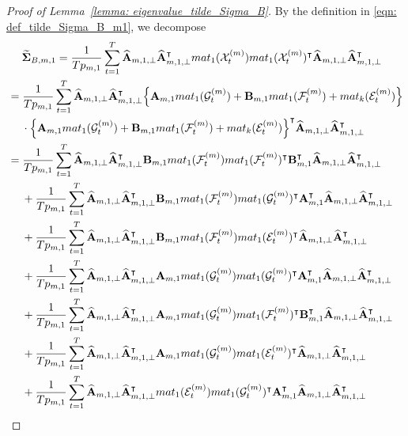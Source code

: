 \documentclass[10pt,a4paper]{amsart}
\def\bA{\mathbf{A}}
\def\bB{\mathbf{B}}
\def\bSigma{\boldsymbol{\Sigma}} \def\bOmega{\boldsymbol{\Omega}}
\def\cE{\mathcal{E}}
\def\cF{\mathcal{F}}
\def\cG{\mathcal{G}} \def\cH{\boldsymbol{\mathcal{H}}} \def\cI{\mathcal{I}}
\def\cX{\mathcal{X}}
\def\mat{\textnormal{\textsc{mat}}}
\def\trans{\intercal}
\def\wh#1{\widehat{#1}}
\def\wt#1{\widetilde{#1}}
\begin{document}
\begin{proof}[Proof of Lemma~\ref{lemma: eigenvalue_tilde_Sigma_B}]
By the definition in \eqref{eqn: def_tilde_Sigma_B_m1}, we decompose
\begin{align}
    &\;\quad
    \wt\bSigma_{B,m,1} = \frac{1}{Tp_{m,1}} \sum_{t=1}^T \wh{\bA}_{m,1,\perp} \wh{\bA}_{m,1,\perp}^\trans \mat_1(\cX_t^{(m)}) \mat_1(\cX_t^{(m)})^\trans \wh{\bA}_{m,1,\perp} \wh{\bA}_{m,1,\perp}^\trans \notag \\
    &=
    \frac{1}{Tp_{m,1}} \sum_{t=1}^T \wh{\bA}_{m,1,\perp} \wh{\bA}_{m,1,\perp}^\trans \Big\{ \bA_{m,1} \mat_1(\cG_t^{(m)}) + \bB_{m,1} \mat_1(\cF_t^{(m)}) + \mat_k(\cE_t^{(m)}) \Big\} \notag \\
    &\;\quad
    \cdot \Big\{ \bA_{m,1} \mat_1(\cG_t^{(m)}) + \bB_{m,1} \mat_1(\cF_t^{(m)}) + \mat_k(\cE_t^{(m)}) \Big\}^\trans \wh{\bA}_{m,1,\perp} \wh{\bA}_{m,1,\perp}^\trans \notag \\
    &=
    \frac{1}{Tp_{m,1}} \sum_{t=1}^T \wh{\bA}_{m,1,\perp} \wh{\bA}_{m,1,\perp}^\trans \bB_{m,1} \mat_1(\cF_t^{(m)}) \mat_1(\cF_t^{(m)})^\trans \bB_{m,1}^\trans \wh{\bA}_{m,1,\perp} \wh{\bA}_{m,1,\perp}^\trans \notag \\
    &\;\quad
    + \frac{1}{Tp_{m,1}} \sum_{t=1}^T \wh{\bA}_{m,1,\perp} \wh{\bA}_{m,1,\perp}^\trans \bB_{m,1} \mat_1(\cF_t^{(m)}) \mat_1(\cG_t^{(m)})^\trans \bA_{m,1}^\trans \wh{\bA}_{m,1,\perp} \wh{\bA}_{m,1,\perp}^\trans \notag \\
    &\;\quad
    + \frac{1}{Tp_{m,1}} \sum_{t=1}^T \wh{\bA}_{m,1,\perp} \wh{\bA}_{m,1,\perp}^\trans \bB_{m,1} \mat_1(\cF_t^{(m)}) \mat_1(\cE_t^{(m)})^\trans \wh{\bA}_{m,1,\perp} \wh{\bA}_{m,1,\perp}^\trans \notag \\
    &\;\quad
    + \frac{1}{Tp_{m,1}} \sum_{t=1}^T \wh{\bA}_{m,1,\perp} \wh{\bA}_{m,1,\perp}^\trans \bA_{m,1} \mat_1(\cG_t^{(m)}) \mat_1(\cG_t^{(m)})^\trans \bA_{m,1}^\trans \wh{\bA}_{m,1,\perp} \wh{\bA}_{m,1,\perp}^\trans \notag \\
    &\;\quad
    + \frac{1}{Tp_{m,1}} \sum_{t=1}^T \wh{\bA}_{m,1,\perp} \wh{\bA}_{m,1,\perp}^\trans \bA_{m,1} \mat_1(\cG_t^{(m)}) \mat_1(\cF_t^{(m)})^\trans \bB_{m,1}^\trans \wh{\bA}_{m,1,\perp} \wh{\bA}_{m,1,\perp}^\trans \notag \\
    &\;\quad
    + \frac{1}{Tp_{m,1}} \sum_{t=1}^T \wh{\bA}_{m,1,\perp} \wh{\bA}_{m,1,\perp}^\trans \bA_{m,1} \mat_1(\cG_t^{(m)}) \mat_1(\cE_t^{(m)})^\trans \wh{\bA}_{m,1,\perp} \wh{\bA}_{m,1,\perp}^\trans \notag \\
    &\;\quad
    + \frac{1}{Tp_{m,1}} \sum_{t=1}^T \wh{\bA}_{m,1,\perp} \wh{\bA}_{m,1,\perp}^\trans \mat_1(\cE_t^{(m)}) \mat_1(\cG_t^{(m)})^\trans \bA_{m,1}^\trans \wh{\bA}_{m,1,\perp} \wh{\bA}_{m,1,\perp}^\trans \notag \\

\end{align}
\end{proof}
\end{document}
